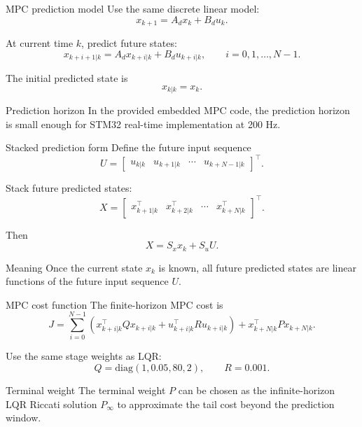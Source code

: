 \documentclass[aspectratio=169]{beamer}
\begin{document}
\begin{frame}{MPC prediction model}
Use the same discrete linear model:
\[
x_{k+1}=A_dx_k+B_du_k.
\]

At current time $k$, predict future states:
\[
x_{k+i+1|k}
=A_dx_{k+i|k}+B_du_{k+i|k},
\qquad i=0,1,\ldots,N-1.
\]

The initial predicted state is
\[
x_{k|k}=x_k.
\]

\vspace{0.15cm}
\begin{block}{Prediction horizon}
\small
In the provided embedded MPC code, the prediction horizon is small enough for STM32 real-time implementation at 200 Hz.
\end{block}
\end{frame}

\begin{frame}{Stacked prediction form}
Define the future input sequence
\[
U=\begin{bmatrix}
u_{k|k}&u_{k+1|k}&\cdots&u_{k+N-1|k}
\end{bmatrix}^\top.
\]

Stack future predicted states:
\[
X=\begin{bmatrix}
x_{k+1|k}^\top&x_{k+2|k}^\top&\cdots&x_{k+N|k}^\top
\end{bmatrix}^\top.
\]

Then
\[
X=S_xx_k+S_uU.
\]

\vspace{0.15cm}
\begin{block}{Meaning}
\small
Once the current state $x_k$ is known, all future predicted states are linear functions of the future input sequence $U$.
\end{block}
\end{frame}

\begin{frame}{MPC cost function}
The finite-horizon MPC cost is
\[
J
=
\sum_{i=0}^{N-1}
\left(
x_{k+i|k}^\top Qx_{k+i|k}
+
u_{k+i|k}^\top Ru_{k+i|k}
\right)
+x_{k+N|k}^\top P x_{k+N|k}.
\]

\vspace{0.15cm}

Use the same stage weights as LQR:
\[
Q=\mathrm{diag}(1,0.05,80,2),
\qquad
R=0.001.
\]

\vspace{0.15cm}
\begin{block}{Terminal weight}
\small
The terminal weight $P$ can be chosen as the infinite-horizon LQR Riccati solution $P_\infty$ to approximate the tail cost beyond the prediction window.
\end{block}
\end{frame}
\end{document}
